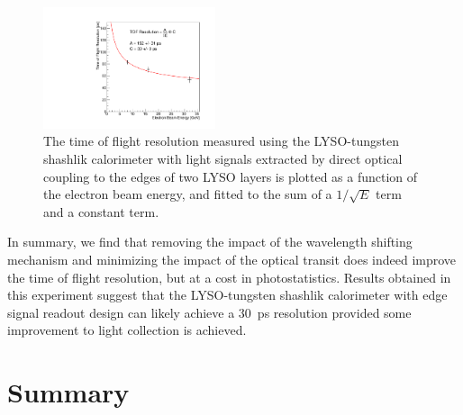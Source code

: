 \documentclass[12pt]{article}
\begin{document}
\begin{figure}[h] \centering
\includegraphics[width=0.45\textwidth]{figs/TimeResolutionVsEnergy_ShashlikSideReadout} 
\caption{ The time of flight resolution measured using the LYSO-tungsten shashlik calorimeter
with light signals extracted by direct optical coupling to the edges of two LYSO layers 
is plotted as a function of the electron beam energy, and fitted to the sum 
of a $1/\sqrt{E}$ term and a constant term. }
\label{fig:ShashlikSideReadoutTOFResolutionVsEnergy}
\end{figure}

In summary, we find that removing the impact of the wavelength shifting mechanism
and minimizing the impact of the optical transit does indeed improve the time
of flight resolution, but at a cost in photostatistics. Results obtained in this
experiment suggest that the LYSO-tungsten shashlik calorimeter with edge
signal readout design can likely achieve a $30$~ps resolution provided 
some improvement to light collection is achieved.

\section{Summary}

{}

\end{document}
